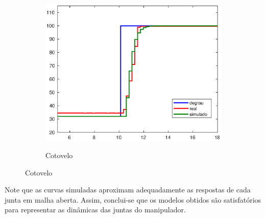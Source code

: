 \begin{figure}[h!]
  \begin{subfigure}{\textwidth}
    \centering
    \caption{Cotovelo}
    \includegraphics[width = 0.5\columnwidth]{Imagens/forearm_ma_simul}
    \label{fig:forearm_ma_simul}
  \end{subfigure}%
  
  \label{fig:ensaioMalhaAbertaSimul} 

\end{figure}

Note que as curvas simuladas aproximam adequadamente as respostas de cada junta em malha aberta. Assim, 
conclui-se que os modelos obtidos são satisfatórios para representar as dinâmicas das juntas do manipulador.

